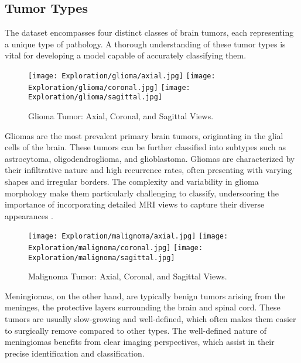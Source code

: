 \subsection{Tumor Types}\label{tumor_types}

The dataset encompasses four distinct classes of brain tumors, each representing a unique type of pathology. A thorough understanding of these tumor types is vital for developing a model capable of accurately classifying them.

\begin{figure}[H]
  \begin{center}
    \texttt{[image: Exploration/glioma/axial.jpg]}
    \texttt{[image: Exploration/glioma/coronal.jpg]}
    \texttt{[image: Exploration/glioma/sagittal.jpg]}
  \end{center}
  \caption{Glioma Tumor: Axial, Coronal, and Sagittal Views.}\label{fig:glioma_views}
\end{figure}

Gliomas are the most prevalent primary brain tumors, originating in the glial cells of the brain. These tumors can be further classified into subtypes such as astrocytoma, oligodendroglioma, and glioblastoma. Gliomas are characterized by their infiltrative nature and high recurrence rates, often presenting with varying shapes and irregular borders. The complexity and variability in glioma morphology make them particularly challenging to classify, underscoring the importance of incorporating detailed MRI views to capture their diverse appearances \cite{abd-ellah_automatic_2024}.

\begin{figure}[H]
  \begin{center}
    \texttt{[image: Exploration/malignoma/axial.jpg]}
    \texttt{[image: Exploration/malignoma/coronal.jpg]}
    \texttt{[image: Exploration/malignoma/sagittal.jpg]}
  \end{center}
  \caption{Malignoma Tumor: Axial, Coronal, and Sagittal Views.}\label{fig:malignoma_views}
\end{figure}


Meningiomas, on the other hand, are typically benign tumors arising from the meninges, the protective layers surrounding the brain and spinal cord. These tumors are usually slow-growing and well-defined, which often makes them easier to surgically remove compared to other types. The well-defined nature of meningiomas benefits from clear imaging perspectives, which assist in their precise identification and classification.

